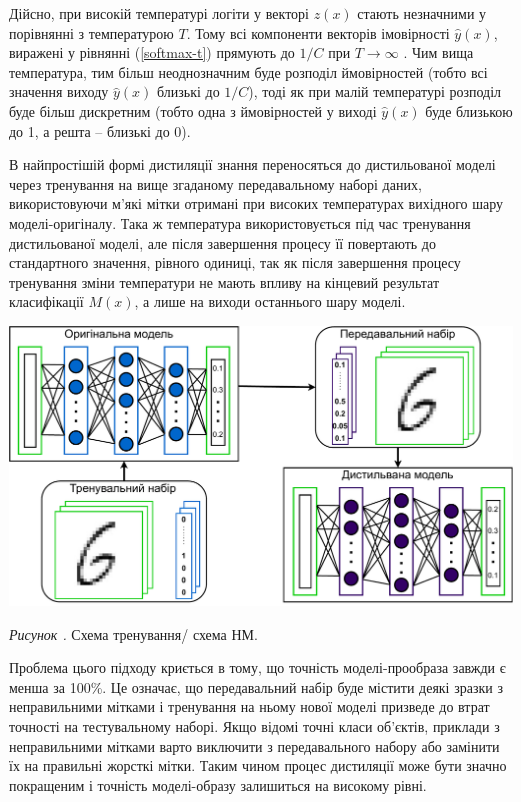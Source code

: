 \documentclass[14pt,a4paper]{extarticle}
\newcounter{e}
\newcounter{pic}
\newcommand{\pic}[1]{\refstepcounter{pic} \vspace{-0.3cm}\textit{Рисунок \arabic{pic}\label{#1}.}}
\numberwithin{equation}{section}
\numberwithin{figure}{section}
\begin{document}
 Дійсно, при високій температурі логіти у векторі $z(x)$ стають незначними у порівнянні з температурою $T$. Тому всі компоненти векторів імовірності $\hat{y}(x)$, виражені у рівнянні (\ref{softmax-t}) прямують до $1/C$ при $T \to \infty $ . Чим вища температура, тим більш неоднозначним буде розподіл ймовірностей (тобто всі значення виходу $\hat{y}(x)$ близькі до $1/C$), тоді як
 при малій температурі розподіл буде більш дискретним (тобто одна з ймовірностей у виході $\hat{y}(x)$ буде близькою до 1, а решта -- близькі до 0).
 
 В найпростішій формі дистиляції знання переносяться до дистильованої моделі через тренування на вище згаданому передавальному наборі даних, використовуючи м'які мітки отримані при високих температурах вихідного шару моделі-оригіналу. Така ж температура використовується під час тренування дистильованої моделі, але після завершення процесу її повертають до стандартного значення, рівного одиниці, так як після завершення процесу тренування зміни температури не мають впливу на кінцевий результат класифікації $M(x)$, а лише на виходи останнього шару моделі.
 
 \begin{center}
 	\includegraphics[width=16cm]{../images/diagrams-Distillation.pdf}
 \end{center}
 \begin{center}
 	\pic{distilation} Схема тренування/ схема НМ.
 \end{center}
 
 Проблема цього підходу криється в тому, що точність моделі-прообраза завжди є менша за 100\%. Це означає, що передавальний набір буде містити деякі зразки з неправильними мітками і тренування на ньому нової моделі призведе до втрат точності на тестувальному наборі. Якщо відомі точні класи об'єктів, приклади з неправильними мітками варто виключити з передавального набору або замінити їх на правильні жорсткі мітки. Таким чином процес дистиляції може бути значно покращеним і точність моделі-образу залишиться на високому рівні.
 
\end{document}

